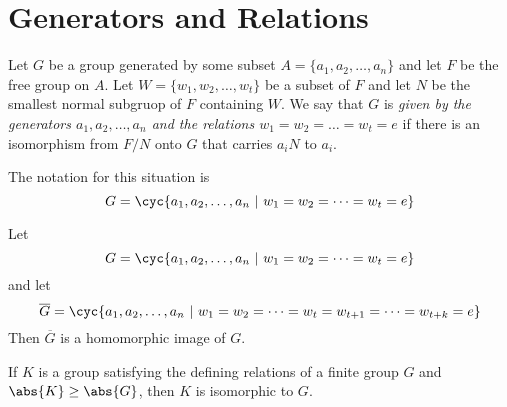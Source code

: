 \section{Generators and Relations}

\begin{definition}
	Let $G$ be a group generated by some subset $A=\{a_1,a_2,\dots,a_n\}$ and let $F$ be the free group on $A$. Let $W = \{w_1,w_2,\dots,w_t\}$ be a subset of $F$ and let $N$ be the smallest normal subgruop of $F$ containing $W$. We say that $G$ is \textit{given by the generators $a_1,a_2,\dots,a_n$ and the relations $w_1=w_2=\dots=w_t=e$} if there is an isomorphism from $F/N$ onto $G$ that carries $a_iN$ to $a_i$.

	\noindent The notation for this situation is
	\[ G = \cyc{a_1,a_2,\dots,a_n\ \vert\ w_1=w_2=\dots=w_t=e} \]
\end{definition}

\begin{theorem}
	Let
	\[ G = \cyc{a_1,a_2,\dots,a_n\ \vert\ w_1=w_2=\dots=w_t=e} \]
	and let
	\[ \overline{G}=\cyc{a_1,a_2,\dots,a_n\ \vert\ w_1=w_2=\dots=w_t=w_{t+1}=\dots=w_{t+k}=e} \]
	Then $\overline{G}$ is a homomorphic image of $G$.
\end{theorem}

\begin{corollary}
	If $K$ is a group satisfying the defining relations of a finite group $G$ and $\abs{K} \geq \abs{G}$, then $K$ is isomorphic to $G$.
\end{corollary}
